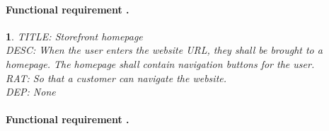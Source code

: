 \documentclass{scrreprt}
\theoremstyle{funreq}
\newtheorem{funreq}{}
\begin{document}
\paragraph[]{Functional requirement .}
\begin{funreq}
	\label{store_home}
	TITLE: Storefront homepage\\
	DESC: When the user enters the website URL, they shall be brought to a homepage.  The homepage shall contain navigation buttons for the user.\\
	RAT: So that a customer can navigate the website.\\
	DEP: None\\
\end{funreq}


\paragraph[]{Functional requirement .}
\end{document}
